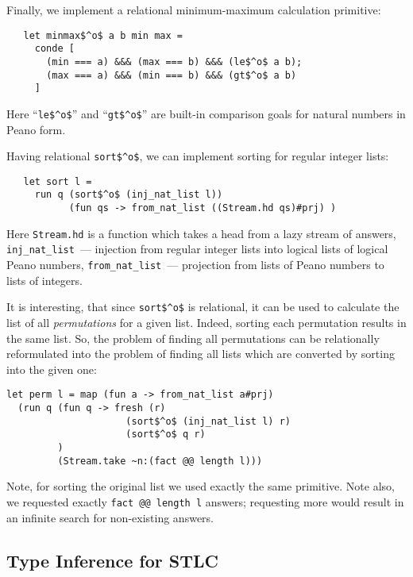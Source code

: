 Finally, we implement a relational minimum-maximum calculation
primitive:

\begin{lstlisting}
   let minmax$^o$ a b min max =
     conde [
       (min === a) &&& (max === b) &&& (le$^o$ a b);
       (max === a) &&& (min === b) &&& (gt$^o$ a b)
     ]
\end{lstlisting}

Here ``\lstinline{le$^o$}'' and ``\lstinline{gt$^o$}'' are built-in comparison goals for natural numbers in Peano form.

Having relational \lstinline{sort$^o$}, we can implement sorting for regular integer lists:

\begin{lstlisting}
   let sort l =
     run q (sort$^o$ (inj_nat_list l))
           (fun qs -> from_nat_list ((Stream.hd qs)#prj) )
\end{lstlisting}

Here \lstinline{Stream.hd} is a function which takes a head from a lazy stream of answers,
\lstinline{inj_nat_list}~--- injection from regular integer lists into logical lists of logical Peano numbers,
\lstinline{from_nat_list}~--- projection from lists of Peano numbers to lists of integers.

It is interesting, that since \lstinline{sort$^o$} is
relational, it can be used to calculate the list of all \emph{permutations}
for a given list. Indeed, sorting each permutation results in the same list.
So, the problem of finding all permutations can be relationally reformulated into
the problem of finding all lists which are converted by sorting into the given one:

\begin{lstlisting}
let perm l = map (fun a -> from_nat_list a#prj)
  (run q (fun q -> fresh (r)
                     (sort$^o$ (inj_nat_list l) r)
                     (sort$^o$ q r)
         )
         (Stream.take ~n:(fact @@ length l)))
\end{lstlisting}

Note, for sorting the original list we used exactly the same primitive. Note also,
we requested exactly \lstinline{fact @@ length l} answers; requesting more
would result in an infinite search for non-existing answers.

\subsection{Type Inference for STLC}

